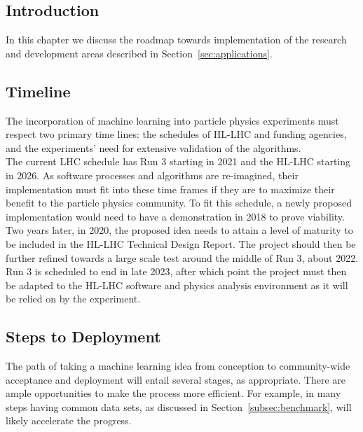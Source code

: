 
\subsection{Introduction}
In this chapter we discuss the roadmap towards implementation of the research and development areas described in Section~\ref{sec:applications}.

\subsection{Timeline}
The incorporation of machine learning into particle physics experiments must respect two primary time lines: the schedules of HL-LHC and funding agencies, and the experiments' need for extensive validation of the algorithms.\\

The current LHC schedule has Run 3 starting in 2021 and the HL-LHC starting in 2026. As software processes and algorithms are re-imagined, their implementation must fit into these time frames if they are to maximize their benefit to the particle physics community. To fit this schedule, a newly proposed implementation would need to have a demonstration in 2018 to prove viability. Two years later, in 2020, the proposed idea needs to attain a level of maturity to be included in the HL-LHC Technical Design Report. The project should then be further refined towards a large scale test around the middle of Run 3, about 2022. Run 3 is scheduled to end in late 2023, after which point the project must then be adapted to the HL-LHC software and physics analysis environment as it will be relied on by the experiment.
%

\subsection{Steps to Deployment}
The path of taking a machine learning idea from conception to community-wide acceptance and deployment will entail several stages, as appropriate. There are ample opportunities to make the process more efficient. For example, in many steps having common data sets, as discussed in Section~\ref{subsec:benchmark}, will likely accelerate the progress.

